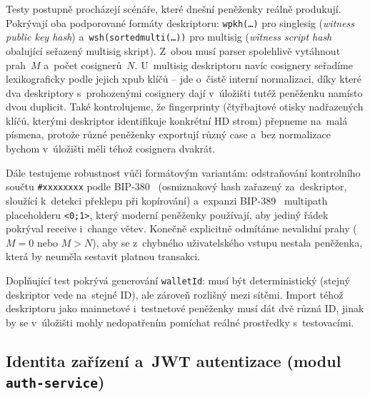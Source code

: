 Testy postupně procházejí scénáře, které dnešní peněženky reálně
produkují. Pokrývají oba podporované formáty deskriptoru:
\texttt{wpkh(\ldots)} pro singlesig (\emph{witness public key hash})
a~\texttt{wsh(sortedmulti(\allowbreak\ldots))} pro multisig
(\emph{witness script hash} obalující seřazený multisig skript).
Z~obou musí parser spolehlivě vytáhnout prah~$M$ a~počet cosignerů~$N$.
U~multisig deskriptoru navíc cosignery seřadíme lexikograficky podle
jejich xpub klíčů -- jde o~čistě interní normalizaci, díky které
dva deskriptory s~prohozenými cosignery dají v~úložišti tutéž peněženku
namísto dvou duplicit. Také kontrolujeme, že fingerprinty (čtyřbajtové
otisky nadřazených klíčů, kterými deskriptor identifikuje konkrétní
HD strom) přepneme na~malá písmena, protože různé peněženky exportují
různý case a~bez normalizace bychom v~úložišti měli téhož cosignera
dvakrát.

Dále testujeme robustnost vůči formátovým variantám: odstraňování
kontrolního součtu \texttt{\#xxxxxxxx} podle BIP-380~\cite{BIP380}
(osmiznakový hash zařazený za~deskriptor, sloužící k~detekci překlepu
při kopírování) a~expanzi BIP-389~\cite{BIP389} multipath placeholderu
\texttt{<0;1>}, který moderní peněženky používají, aby jediný řádek
pokrýval receive i~change větev. Konečně explicitně odmítáme nevalidní
prahy ($M=0$ nebo $M>N$), aby se z~chybného uživatelského vstupu
nestala peněženka, která by neuměla sestavit platnou transakci.

Doplňující test pokrývá generování \texttt{walletId}: musí být
deterministický (stejný deskriptor vede na~stejné ID), ale zároveň
rozlišný mezi sítěmi. Import téhož deskriptoru jako mainnetové
i~testnetové peněženky musí dát dvě různá ID, jinak by se v~úložišti
mohly nedopatřením pomíchat reálné prostředky s~testovacími.

\subsection[Identita zařízení a~JWT autentizace]{Identita zařízení
a~JWT autentizace (modul \texttt{auth-service})}
\label{subsec:test-auth}

